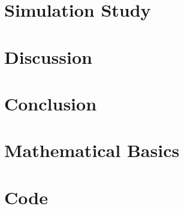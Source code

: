 \documentclass[12pt, a4paper, bibtotoc, liststotoc]{scrartcl}
\begin{document}
\section{Simulation Study}
\label{sec:simulation study}

\section{Discussion}
\label{sec:discussion}

\section{Conclusion}
\label{sec:conclusion}





\newpage
\appendix
{}

\section{Mathematical Basics}
\label{sec:first order conditions}

\section{Code}
\label{sec:data preparation}



\newpage

\nocite{von_gaudecker_templates_2019}
\printbibliography
\end{document}
